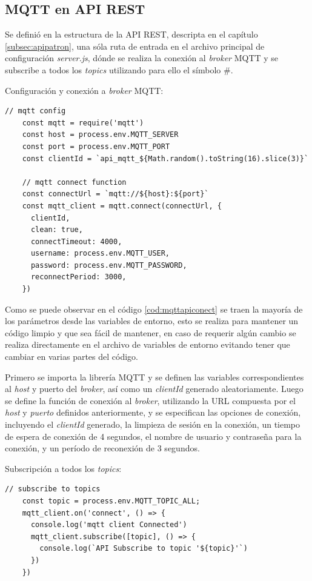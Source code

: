 \subsection{MQTT en API REST}
\label{subsec:mqttapi}

Se definió en la estructura de la API REST, descripta en el capítulo \ref{subsec:apipatron}, una sóla ruta de entrada en el archivo principal de configuración \textit{server.js}, dónde se realiza la conexión al \textit{broker} MQTT y se subscribe a todos los \textit{topics} utilizando para ello el símbolo \#. 

Configuración y conexión a \textit{broker} MQTT:
\begin{lstlisting}[label=cod:mqttapiconect,caption= Configuración y conexión a \textit{broker} MQTT en API REST.]
 // mqtt config
    const mqtt = require('mqtt')
    const host = process.env.MQTT_SERVER
    const port = process.env.MQTT_PORT
    const clientId = `api_mqtt_${Math.random().toString(16).slice(3)}`
    
    // mqtt connect function
    const connectUrl = `mqtt://${host}:${port}`
    const mqtt_client = mqtt.connect(connectUrl, {
      clientId,
      clean: true,
      connectTimeout: 4000,
      username: process.env.MQTT_USER,
      password: process.env.MQTT_PASSWORD,
      reconnectPeriod: 3000,
    })
\end{lstlisting}

Como se puede observar en el código \ref{cod:mqttapiconect} se traen la mayoría de los parámetros desde las variables de entorno, esto se realiza para mantener un código limpio y que sea fácil de mantener, en caso de requerir algún cambio se realiza directamente en el archivo de variables de entorno evitando tener que cambiar en varias partes del código.

Primero se importa la librería MQTT y se definen las variables correspondientes al \textit{host} y puerto del \textit{broker}, así como un \textit{clientId} generado aleatoriamente. Luego se define la función de conexión al \textit{broker}, utilizando la URL compuesta por el \textit{host} y \textit{puerto} definidos anteriormente, y se especifican las opciones de conexión, incluyendo el \textit{clientId} generado, la limpieza de sesión en la conexión, un tiempo de espera de conexión de 4 segundos, el nombre de usuario y contraseña para la conexión, y un período de reconexión de 3 segundos.


Subscripción a todos los \textit{topics}:

\begin{lstlisting}[label=cod:mqttapisub,caption=Subscripción a \textit{topics} en API REST.]
// subscribe to topics
    const topic = process.env.MQTT_TOPIC_ALL;
    mqtt_client.on('connect', () => {
      console.log('mqtt client Connected')
      mqtt_client.subscribe([topic], () => {
        console.log(`API Subscribe to topic '${topic}'`)
      })
    })
\end{lstlisting}


